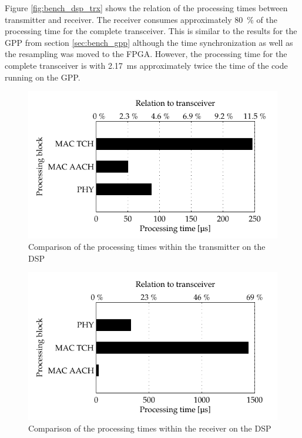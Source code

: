 Figure \ref{fig:bench_dsp_trx} shows the relation of the processing times between transmitter and receiver. The receiver consumes approximately \SI{80}{\%} of the processing time for the complete transceiver. This is similar to the results for the GPP from section \ref{sec:bench_gpp} although the time synchronization as well as the resampling was moved to the \ac{FPGA}. However, the processing time for the complete transceiver is with \SI{2.17}{ms} approximately twice the time of the code running on the \ac{GPP}.

\begin{figure}[h]
	\centering
		\includegraphics{../kapitel05/figures/bench_dsp_tx.pdf}
	\caption{Comparison of the processing times within the transmitter on the DSP}
	\label{fig:bench_dsp_tx}
\end{figure}


\begin{figure}[h]
	\centering
		\includegraphics{../kapitel05/figures/bench_dsp_rx.pdf}
	\caption{Comparison of the processing times within the receiver on the DSP}
	\label{fig:bench_dsp_rx}
\end{figure}


